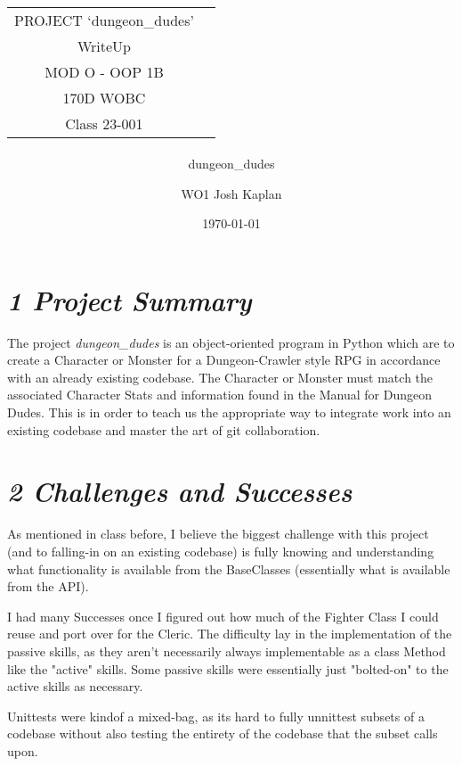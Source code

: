 \documentclass[11pt]{extbook}
\title{%
\begin{tabular}{cl}
PROJECT `dungeon\_dudes'\tabularnewline
\large WriteUp\tabularnewline
\large MOD O - OOP 1B\tabularnewline
\small 170D WOBC\tabularnewline
\small Class 23-001\tabularnewline
\end{tabular}
}
\subtitle{\large dungeon\_dudes}
\author{%
\begin{tabular}{cl}
WO1 Josh Kaplan
\end{tabular}
}
\date{\today}
\newcommand\tab[1][1cm]{\hspace*{#1}}
\begin{document}
\maketitle


% 
\section{\emph{1 Project Summary}}

\tab The project \emph{dungeon\_dudes} is an object-oriented program in Python 
which are to create a Character or Monster for a Dungeon-Crawler style RPG
in accordance with an already existing codebase. The Character or Monster must
match the associated Character Stats and information found in the Manual for 
Dungeon Dudes. This is in order to teach us the appropriate way to integrate 
work into an existing codebase and master the art of git collaboration. 

% 
\section{\emph{2 Challenges and Successes}}

\tab As mentioned in class before, I believe the biggest challenge with this 
project (and to falling-in on an existing codebase) is fully knowing and 
understanding what functionality is available from the BaseClasses 
(essentially what is available from the API). 

\tab I had many Successes once I figured out how much of the Fighter Class I 
could reuse and port over for the Cleric. The difficulty lay in the 
implementation of the passive skills, as they aren't necessarily always 
implementable as a class Method like the "active" skills. Some passive skills
were essentially just "bolted-on" to the active skills as necessary.

\tab Unittests were kindof a mixed-bag, as its hard to fully unnittest subsets
of a codebase without also testing the entirety of the codebase that the subset
calls upon.
\end{document}
